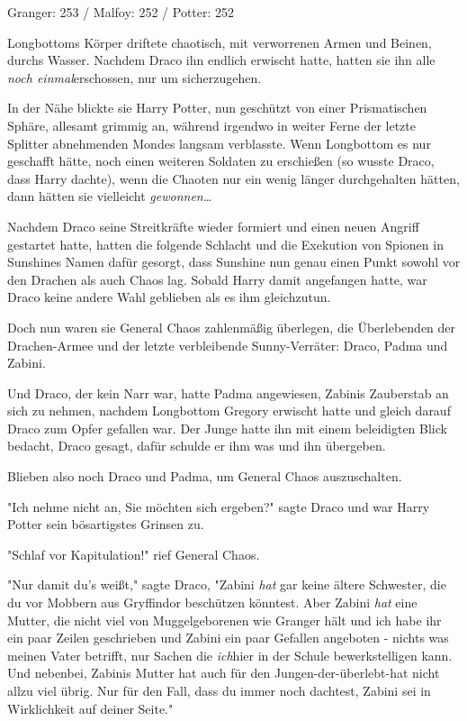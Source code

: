 {\later

Granger: 253 / Malfoy: 252 / Potter: 252

Longbottoms Körper driftete chaotisch, mit verworrenen Armen und Beinen, durchs Wasser. Nachdem Draco ihn endlich erwischt hatte, hatten sie ihn alle \emph{noch einmal}erschossen, nur um sicherzugehen.

In der Nähe blickte sie Harry Potter, nun geschützt von einer Prismatischen Sphäre, allesamt grimmig an, während irgendwo in weiter Ferne der letzte Splitter abnehmenden Mondes langsam verblasste. Wenn Longbottom es nur geschafft hätte, noch einen weiteren Soldaten zu erschießen (so wusste Draco, dass Harry dachte), wenn die Chaoten nur ein wenig länger durchgehalten hätten, dann hätten sie vielleicht \emph{gewonnen…}

Nachdem Draco seine Streitkräfte wieder formiert und einen neuen Angriff gestartet hatte, hatten die folgende Schlacht und die Exekution von Spionen in Sunshines Namen dafür gesorgt, dass Sunshine nun genau einen Punkt sowohl vor den Drachen als auch Chaos lag. Sobald Harry damit angefangen hatte, war Draco keine andere Wahl geblieben als es ihm gleichzutun.

Doch nun waren sie General Chaos zahlenmäßig überlegen, die Überlebenden der Drachen-Armee und der letzte verbleibende Sunny-Verräter: Draco, Padma und Zabini.

Und Draco, der kein Narr war, hatte Padma angewiesen, Zabinis Zauberstab an sich zu nehmen, nachdem Longbottom Gregory erwischt hatte und gleich darauf Draco zum Opfer gefallen war. Der Junge hatte ihn mit einem beleidigten Blick bedacht, Draco gesagt, dafür schulde er ihm was und ihn übergeben.

Blieben also noch Draco und Padma, um General Chaos auszuschalten.

"Ich nehme nicht an, Sie möchten sich ergeben?" sagte Draco und war Harry Potter sein bösartigstes Grinsen zu.

"Schlaf vor Kapitulation!" rief General Chaos.

"Nur damit du's weißt," sagte Draco, "Zabini \emph{hat} gar keine ältere Schwester, die du vor Mobbern aus Gryffindor beschützen könntest. Aber Zabini \emph{hat} eine Mutter, die nicht viel von Muggelgeborenen wie Granger hält und ich habe ihr ein paar Zeilen geschrieben und Zabini ein paar Gefallen angeboten - nichts was meinen Vater betrifft, nur Sachen die \emph{ich}hier in der Schule bewerkstelligen kann. Und nebenbei, Zabinis Mutter hat auch für den Jungen-der-überlebt-hat nicht allzu viel übrig. Nur für den Fall, dass du immer noch dachtest, Zabini sei in Wirklichkeit auf deiner Seite."

}
